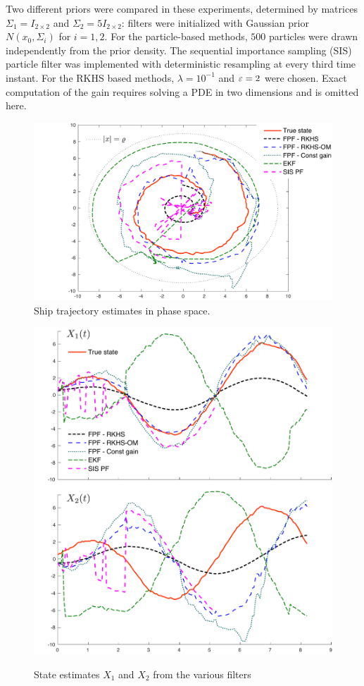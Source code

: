 Two different priors were compared in these experiments, determined by matrices $\Sigma_1 = I_{2\times 2}$ and $ \Sigma_2 = 5 I_{2\times2}$:   filters were initialized with Gaussian prior $N(x_0, \Sigma_i)$ for $i=1,2$. For the particle-based methods, $500$ particles were drawn independently from the prior density. The sequential importance sampling (SIS) particle filter was implemented with deterministic resampling at every third time instant.  For the RKHS based methods, $\lambda = 10^{-1}$ and $\varepsilon = 2$ were chosen. Exact computation of the gain requires solving a PDE in two dimensions and is omitted here.

\begin{figure}[htbp]
   \centering
	\includegraphics[width=5in]{images/Chap4_ship_state_comparison}
	\caption{Ship trajectory estimates in phase space.}
	\label{fig:ship_state_estimate}
\end{figure}
\begin{figure}[htbp]
	
	\centering
	\includegraphics[width =5in] {images/Chap4_ship_state12_comparison}
	\label{fig:ship_state_time_estimate}
	\caption{ State estimates $X_1$ and $X_2$ from the various filters}
\end{figure}

